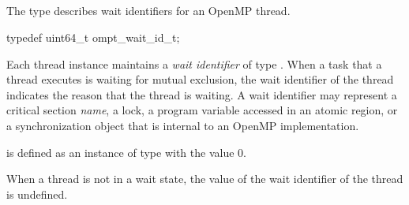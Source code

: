 \subsection{}
\label{sec:ompt_wait_id_t}

\summary
The  type describes wait identifiers for an OpenMP thread.

\format
\begin{ccppspecific}
\begin{omptOther}
typedef uint64_t ompt_wait_id_t;
\end{omptOther}
\end{ccppspecific}

\descr
Each thread instance maintains a \emph{wait identifier} of type 
. When a task that a thread executes is waiting 
for mutual exclusion, the wait identifier of the thread indicates the 
reason that the thread is waiting. A wait identifier may represent a 
critical section {\em name}, a lock, a program variable accessed in an 
atomic region, or a synchronization object that is internal to an 
OpenMP implementation.

 is defined as an instance of type 
 with the value 0.

When a thread is not in a wait state, the value of the wait identifier 
of the thread is undefined.

